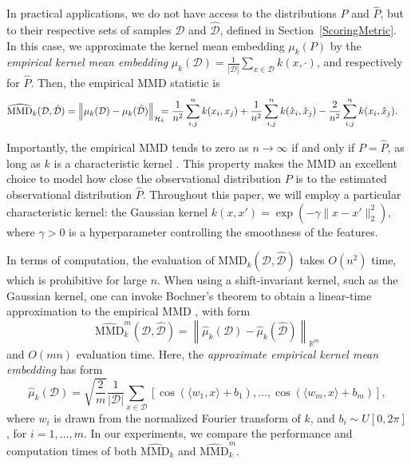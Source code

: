 \documentclass[a4paper, 11pt]{article}
\begin{document}
In practical applications, we do not have access to the distributions $P$ and
$\hat{P}$, but to their respective sets of samples $\mathcal{D}$ and
$\hat{\mathcal{D}}$, defined in Section~\ref{ScoringMetric}. In this case, we
approximate the kernel mean embedding $\mu_k(P)$ by the \emph{empirical kernel
mean embedding} $\mu_k(\mathcal{D}) = \frac{1}{|\mathcal{D}|} \sum_{x \in
\mathcal{D}} k(x, \cdot)$, and respectively for $\hat{P}$. Then, the empirical
MMD statistic is 
\begin{align*}
\widehat{\text{MMD}}_k(\mathcal{D}, \hat{\mathcal{D}}) &= \left\|
\mu_k(\mathcal{D}) - \mu_k(\hat{\mathcal{D}}) \right\|_{\mathcal{H}_k}
\hspace{-0.25cm}
=\frac{1}{n^2} \sum_{i, j}^{n} k(x_i, x_j) +
\frac{1}{n^2} \sum_{i, j}^{n} k(\hat{x}_i, \hat{x}_j)
- \frac{2}{n^2} \sum_{i,j}^n k(x_i, \hat{x}_j).
\end{align*}

Importantly, the empirical MMD tends to zero as $n \to \infty$ if and only if
$P = \hat{P}$, as long as $k$ is a characteristic kernel
\citep{gretton2007kernel}. This property makes the MMD an excellent choice to
model how close the observational distribution $P$ is to the estimated
observational distribution $\hat{P}$. Throughout this paper, we will employ
a particular characteristic kernel: the Gaussian kernel $k(x, x') = \exp(-
\gamma \| x - x' \|_2^2)$, where $\gamma > 0$ is a hyperparameter controlling
the smoothness of the features. 

In terms of computation, the evaluation of $\text{MMD}_k(\mathcal{D},
\hat{\mathcal{D}})$ takes $O(n^2)$ time, which is prohibitive for large $n$.
When using a shift-invariant kernel, such as the Gaussian kernel, one can
invoke Bochner's theorem \citep{edwards1964fourier} to obtain a linear-time
approximation to the empirical MMD \citep{lopez2015towards}, with form 
\begin{equation*}
\widehat{\text{MMD}}^m_k(\mathcal{D}, \hat{\mathcal{D}}) = 
\left\|
  \hat{\mu}_k(\mathcal{D}) - \hat{\mu}_k(\hat{\mathcal{D}})
\right\|_{\mathbb{R}^m}
\label{eq:approx_mmd}
\end{equation*}
and $O(mn)$ evaluation time. Here, the \emph{approximate empirical kernel mean
embedding} has form
\begin{equation*}
  \hat{\mu}_k(\mathcal{D}) = \sqrt{\frac{2}{m}} \frac{1}{|\mathcal{D}|} \sum_{x
  \in \mathcal{D}} \left[ \cos(\langle w_1, x \rangle + b_1), \ldots,
  \cos(\langle w_m, x \rangle + b_m) \right],
\end{equation*}
where $w_i$ is drawn from the normalized Fourier transform of $k$, and $b_i
\sim U[0, 2\pi]$, for $i=1, \ldots, m$.  In our experiments, we compare the
performance and computation times of both $\widehat{\text{MMD}}_k$ and
$\widehat{\text{MMD}}_k^m$. 
\end{document}
